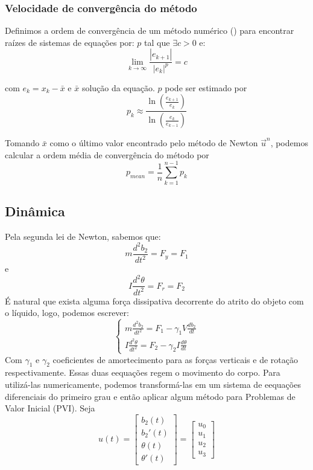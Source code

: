 \documentclass[
	12pt,				%
	oneside,			%
	a4paper,			%
	]{article}
\begin{document}
    \subsubsection{Velocidade de convergência do método}
    Definimos a ordem de convergência de um método numérico (\cite{franco_calculo_numerico}) para encontrar raízes de sistemas de equações por: $p$ tal que $\exists c > 0$ e:
    \[
        \lim_{k \to \infty} \frac{|e_{k+1}|}{|e_k|^p} = c
    \]

    com $e_k = x_k - \bar{x}$ e $\bar{x}$ solução da equação. $p$ pode ser estimado por 
    \[
        p_k \approx \frac{\ln\left( \frac{e_{k+1}}{e_k} \right)}{\ln\left( \frac{e_k}{e_{k-1}} \right)}
    \]

    Tomando $\bar{x}$ como o último valor encontrado pelo método de Newton $\vec{u}^n$, podemos calcular a ordem média de convergência do método por 
    \[
        p_{mean} = \frac{1}{n}\sum_{k=1}^{n-1} p_k
    \]


    \subsection{Dinâmica}
    \label{sec:din}
    Pela segunda lei de Newton, sabemos que:
    \[
        m \frac{d^2b_2}{dt^2} = F_y = F_1
    \]
    e
    \[
        I \frac{d^2 \theta}{dt^2} = F_r = F_2
    \]
    É natural que exista alguma força dissipativa decorrente do atrito do objeto com o líquido, logo, podemos escrever:
    \begin{equation}
        \begin{cases}
            m \frac{d^2b_2}{dt^2} = F_1 - \gamma_1 V \frac{db_2}{dt} \\
            I \frac{d^2 \theta}{dt^2} = F_2 - \gamma_2 I \frac{d\theta}{dt}
        \end{cases}
    \end{equation}
    Com $\gamma_1$ e $\gamma_2$ coeficientes de amortecimento para as forças verticais e de rotação respectivamente. Essas duas eequações regem o movimento do corpo. Para utilizá-las numericamente, podemos transformá-las em um sistema de eequações diferenciais do primeiro grau e então aplicar algum método para Problemas de Valor Inicial (PVI). Seja
    \[
        u(t) = \begin{bmatrix}
            b_2(t) \\
            b_2'(t) \\
            \theta(t) \\
            \theta '(t)
        \end{bmatrix} = \begin{bmatrix}
            u_0 \\ u_1 \\ u_2 \\ u_3
        \end{bmatrix}
    \]
\end{document}

